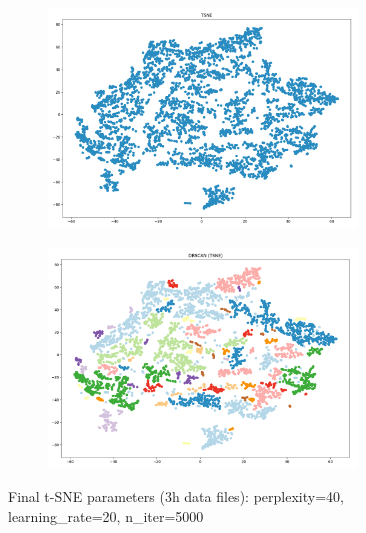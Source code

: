 \begin{figure}
  \centering
	\begin{subfigure}{.5\textwidth}
    \centering
    \includegraphics[width=0.9\textwidth]{./images/tsneParametersTest/3h-1-finalTSNE.png}
  \end{subfigure}%
  \begin{subfigure}{.5\textwidth}
    \centering
    \includegraphics[width=0.9\textwidth]{./images/tsneParametersTest/3h-1-finalTSNEDBSCAN.png}
	\end{subfigure}
	\caption{Final t-SNE parameters (3h data files): perplexity=40, learning\_rate=20, n\_iter=5000}
  \label{figure:finalTSNE3h}
\end{figure}

